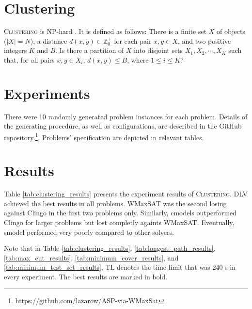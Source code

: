 \documentclass[]{article}
\begin{document}
\section{Clustering}

\textsc{Clustering} is NP-hard \cite{brucker1978complexity}. It is defined as follows:
There is a finite set $ X $ of objects ($ |X| = N $), a distance $ d(x, y) \in \mathbb{Z}^{+}_{0} $ for each pair
$ x,y \in X $, and two positive integers $ K $ and $ B $. Is there a partition of $ X $ into disjoint sets $ X_1, X_2, \cdots, X_K $
such that, for all pairs $ x,y \in X_i $, $ d(x,y) \leq B $, where $ 1 \leq i \leq K $?

\section{Experiments}

There were 10 randomly generated problem instances for each problem.
Details of the generating procedure, as well as configurations, are described 
in the GitHub repository.\footnote{https://github.com/lazarow/ASP-via-WMaxSat}.
Problems' specification are depicted in relevant tables.

\section{Results}

Table \ref{tab:clustering_results} presents the experiment results of \textsc{Clustering}.
DLV achieved the best results in all problems. WMaxSAT was the second losing against Clingo in the first two problems only.
Similarly, cmodels outperformed Clingo for larger problems but lost completly againts WMaxSAT.
Eventually, smodel performed very poorly compared to other solvers.

Note that in Table \ref{tab:clustering_results}, \ref{tab:longest_path_results}, 
\ref{tab:max_cut_results}, \ref{tab:minimum_cover_results}, and \ref{tab:minimum_test_set_results},
TL denotes the time limit that was 240 s in every experiment. The best results are marked in bold.
\end{document}
